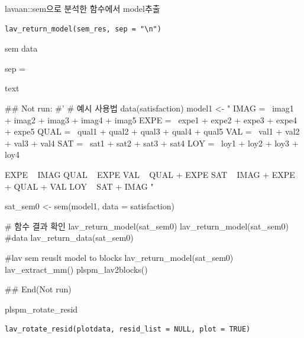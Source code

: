 \documentclass[a4paper]{book}
\begin{document}
%
\begin{Description}
lavaan::sem으로 분석한 함수에서 model추출
\end{Description}
%
\begin{Usage}
\begin{verbatim}
lav_return_model(sem_res, sep = "\n")
\end{verbatim}
\end{Usage}
%
\begin{Arguments}
\begin{ldescription}
\item[\code{sem\_res}] sem data

\item[\code{sep}] sep =
\end{ldescription}
\end{Arguments}
%
\begin{Value}
text
\end{Value}
%
\begin{Examples}
\begin{ExampleCode}

## Not run: 
#'
# 예시 사용법
data(satisfaction)
model1 <- "
IMAG =~ imag1 + imag2 + imag3 + imag4 + imag5
EXPE =~ expe1 + expe2 + expe3 + expe4 + expe5
QUAL =~ qual1 + qual2 + qual3 + qual4 + qual5
VAL =~ val1 + val2 + val3 + val4
SAT =~ sat1 + sat2 + sat3 + sat4
LOY =~ loy1 + loy2 + loy3 + loy4

EXPE ~ IMAG
QUAL ~ EXPE
VAL ~  QUAL + EXPE
SAT ~ IMAG + EXPE + QUAL + VAL
LOY ~ SAT + IMAG
"

sat_sem0 <- sem(model1, data = satisfaction)

# 함수 결과 확인
lav_return_model(sat_sem0)
lav_return_model(sat_sem0)%
#data
lav_return_data(sat_sem0)

#lav sem reuslt  model to blocks
lav_return_model(sat_sem0)%
  lav_extract_mm()%
  plspm_lav2blocks()



## End(Not run)


\end{ExampleCode}
\end{Examples}
%
\begin{Description}
plspm\_rotate\_resid
\end{Description}
%
\begin{Usage}
\begin{verbatim}
lav_rotate_resid(plotdata, resid_list = NULL, plot = TRUE)
\end{verbatim}
\end{Usage}
\end{document}
